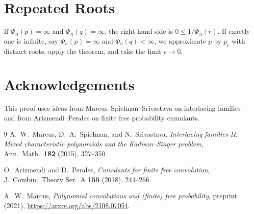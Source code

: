 \documentclass[12pt]{article}
\theoremstyle{definition}
\begin{document}
\section{Repeated Roots}\label{sec:repeated}

If $\Phi_n(p)=\infty$ and $\Phi_n(q)=\infty$, the right-hand side is $0\le 1/\Phi_n(r)$.
If exactly one is infinite, say $\Phi_n(p)=\infty$ and $\Phi_n(q)<\infty$, we approximate $p$
by $p_\epsilon$ with distinct roots, apply the theorem, and take the limit $\epsilon\to 0$.

\section*{Acknowledgements}

This proof uses ideas from Marcus--Spielman--Srivastava \cite{MSS15} on interlacing families
and from Arizmendi--Perales \cite{AP18} on finite free probability cumulants.

\begin{thebibliography}{9}
A.~W.~Marcus, D.~A.~Spielman, and N.~Srivastava,
\emph{Interlacing families {II}: Mixed characteristic polynomials and the {Kadison--Singer}
problem},
Ann.\ Math.\ \textbf{182} (2015), 327--350.

O.~Arizmendi and D.~Perales,
\emph{Cumulants for finite free convolution},
J.\ Combin.\ Theory Ser.\ A \textbf{155} (2018), 244--266.

A.~W.~Marcus,
\emph{Polynomial convolutions and (finite) free probability},
preprint (2021), \url{https://arxiv.org/abs/2108.07054}.
\end{thebibliography}
\end{document}
